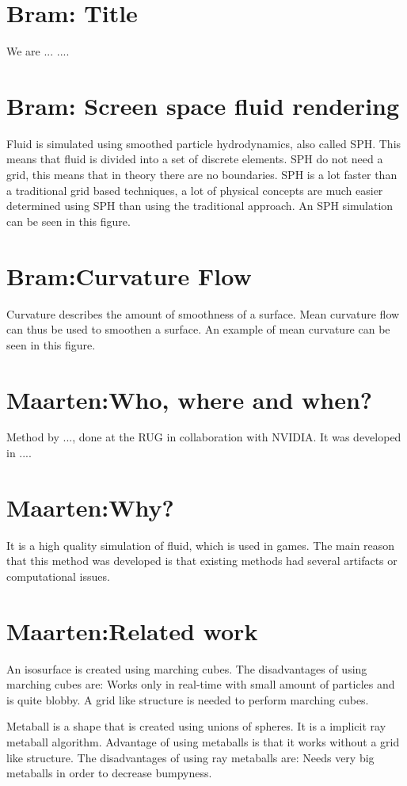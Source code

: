\documentclass{article}
\begin{document}
\section{Bram: Title}

We are ... .... 
\section{Bram: Screen space fluid rendering}
Fluid is simulated using smoothed particle hydrodynamics, also called SPH.
This means that fluid is divided into a set of discrete elements.
SPH do not need a grid, this means that in theory there are no boundaries.
SPH is a lot faster than a traditional grid based techniques, a lot of physical concepts are much easier determined using SPH than using the traditional approach. 
An SPH simulation can be seen in this figure.

\section{Bram:Curvature Flow}
Curvature describes the amount of smoothness of a surface.
Mean curvature flow can thus be used to smoothen a surface.
An example of mean curvature can be seen in this figure.

\section{Maarten:Who, where and when?}
Method by ..., done at the RUG in collaboration with NVIDIA. 
It was developed in ....

\section{Maarten:Why?}
It is a high quality simulation of fluid, which is used in games.
The main reason that this method was developed is that existing methods had several artifacts or computational issues.

\section{Maarten:Related work}
An isosurface is created using marching cubes.
The disadvantages of using marching cubes are:
Works only in real-time with small amount of particles and is quite blobby.
A grid like structure is needed to perform marching cubes.


Metaball is a shape that is created using unions of spheres.
It is a implicit ray metaball algorithm.
Advantage of using metaballs is that it works without a grid like structure.
The disadvantages of using ray metaballs are:
Needs very big metaballs in order to decrease bumpyness.
\end{document}

